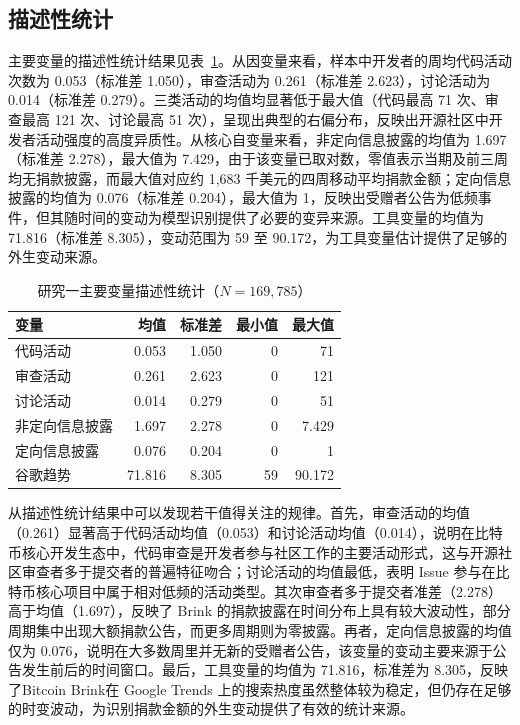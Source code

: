 \documentclass[
    type = master, %
    degree = professional,        %
    decl-page,  %
    twoside,                %
    fontset = fandol %
  ]{njuthesis}
\begin{document}
\subsection{描述性统计}

主要变量的描述性统计结果见表~\ref{tab:desc-stats}。从因变量来看，样本中开发者的周均代码活动次数为 0.053（标准差 1.050），审查活动为 0.261（标准差 2.623），讨论活动为 0.014（标准差 0.279）。三类活动的均值均显著低于最大值（代码最高 71 次、审查最高 121 次、讨论最高 51 次），呈现出典型的右偏分布，反映出开源社区中开发者活动强度的高度异质性。从核心自变量来看，非定向信息披露的均值为 1.697（标准差 2.278），最大值为 7.429，由于该变量已取对数，零值表示当期及前三周均无捐款披露，而最大值对应约 1,683 千美元的四周移动平均捐款金额；定向信息披露的均值为 0.076（标准差 0.204），最大值为 1，反映出受赠者公告为低频事件，但其随时间的变动为模型识别提供了必要的变异来源。工具变量的均值为 71.816（标准差 8.305），变动范围为 59 至 90.172，为工具变量估计提供了足够的外生变动来源。

\begin{table}[htbp]
    \centering
    \small
    \caption{研究一主要变量描述性统计（$N = 169{,}785$）}
    \label{tab:desc-stats}
    \begin{tabularx}{\textwidth}{Xrrrr}
        \toprule
        变量 & 均值 & 标准差 & 最小值 & 最大值 \\
        \midrule
        代码活动      & 0.053 & 1.050 & 0 & 71 \\
        审查活动    & 0.261 & 2.623 & 0 & 121 \\
        讨论活动     & 0.014 & 0.279 & 0 & 51 \\
        非定向信息披露 & 1.697 & 2.278 & 0 & 7.429 \\
        定向信息披露 & 0.076 & 0.204 & 0 & 1 \\
        谷歌趋势 & 71.816 & 8.305 & 59 & 90.172 \\
        \bottomrule
    \end{tabularx}
\end{table}

从描述性统计结果中可以发现若干值得关注的规律。首先，审查活动的均值（0.261）显著高于代码活动均值（0.053）和讨论活动均值（0.014），说明在比特币核心开发生态中，代码审查是开发者参与社区工作的主要活动形式，这与开源社区审查者多于提交者的普遍特征吻合；讨论活动的均值最低，表明 Issue 参与在比特币核心项目中属于相对低频的活动类型。其次审查者多于提交者准差（2.278）高于均值（1.697），反映了 Brink 的捐款披露在时间分布上具有较大波动性，部分周期集中出现大额捐款公告，而更多周期则为零披露。再者，定向信息披露的均值仅为 0.076，说明在大多数周里并无新的受赠者公告，该变量的变动主要来源于公告发生前后的时间窗口。最后，工具变量的均值为 71.816，标准差为 8.305，反映了Bitcoin Brink在 Google Trends 上的搜索热度虽然整体较为稳定，但仍存在足够的时变波动，为识别捐款金额的外生变动提供了有效的统计来源。
\end{document}

